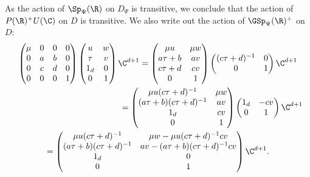 As the action of $\Sp_\Psi(\R)$ on $D_\Psi$ is transitive, we conclude
that the action of $P(\R)^+U(\C)$ on $D$ is transitive. We also write
out the action of $\GSp_\Psi(\R)^+$ on~$D$:
\begin{multline}\label{eq:GSp-action}
\begin{pmatrix}
\mu & 0 & 0 & 0\\
0 & a & b & 0\\
0 & c & d & 0\\
0 & 0 & 0 & 1
\end{pmatrix}
\begin{pmatrix}
u & w\\ \tau & v \\ 1_d & 0\\ 0 & 1
\end{pmatrix}
\C^{d+1} =
\begin{pmatrix}
\mu u & \mu w\\ a\tau +b & av \\ c\tau+ d & cv\\ 0 & 1
\end{pmatrix}
\begin{pmatrix}
(c\tau+d)^{-1} & 0 \\ 0 & 1
\end{pmatrix}
\C^{d+1}\\
\hspace*{4.5cm}=
\begin{pmatrix}
\mu u (c\tau+d)^{-1} & \mu w\\ (a\tau +b) (c\tau+d)^{-1} & av \\ 1_d & cv\\ 0 & 1
\end{pmatrix}
\begin{pmatrix}
1_d & -cv \\0 & 1
\end{pmatrix}
\C^{d+1}\\ =
\begin{pmatrix}
\mu u (c\tau+d)^{-1} & \mu w-\mu u (c\tau+d)^{-1}cv\\
(a\tau +b) (c\tau+d)^{-1} & av -(a\tau +b) (c\tau+d)^{-1} cv\\ 1_d & 0\\ 0 & 1
\end{pmatrix} \C^{d+1}.
\end{multline}


